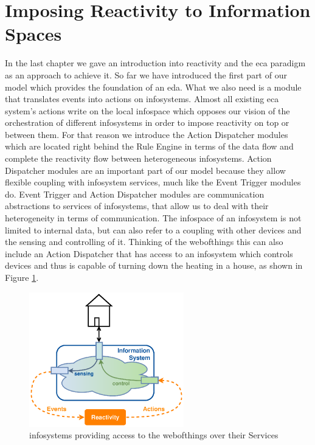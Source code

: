 \section{Imposing Reactivity to Information Spaces}
In the last chapter we gave an introduction into reactivity and the \textrm{\acrshort{eca}} paradigm as an approach to achieve it.
So far we have introduced the first part of our model which provides the foundation of an \textrm{\acrlong{eda}}.
What we also need is a module that translates events into actions on \textrm{\glspl{infosystem}}.
Almost all existing \textrm{\acrshort{eca}} system's actions write on the local \textrm{\gls{infospace}} which opposes our vision of the orchestration of different \textrm{\glspl{infosystem}} in order to impose reactivity on top or between them.
For that reason we introduce the \textrm{Action Dispatcher} modules which are located right behind the \textrm{Rule Engine} in terms of the data flow and complete the reactivity flow between heterogeneous \textrm{\glspl{infosystem}}.
\textrm{Action Dispatcher} modules are an important part of our model because they allow flexible coupling with \textrm{\gls{infosystem}} services, much like the \textrm{Event Trigger} modules do.
\textrm{Event Trigger} and \textrm{Action Dispatcher} modules are communication abstractions to services of \textrm{\glspl{infosystem}}, that allow us to deal with their heterogeneity in terms of communication.
The \textrm{\gls{infospace}} of an \textrm{\gls{infosystem}} is not limited to internal data, but can also refer to a coupling with other devices and the sensing and controlling of it.
Thinking of the \textrm{\gls{webofthings}} this can also include an \textrm{Action Dispatcher} that has access to an \textrm{\gls{infosystem}} which controls devices and thus is capable of turning down the heating in a house, as shown in Figure \ref{fig:InformationSystemWoT}.
\begin{figure}[!ht]
  \centering
  \includegraphics[width=0.6\textwidth]{figures/InformationSystemWoT}
  \caption{\textrm{\glspl{infosystem}} providing access to the \textrm{\gls{webofthings}} over their Services}
  \label{fig:InformationSystemWoT}
\end{figure}

